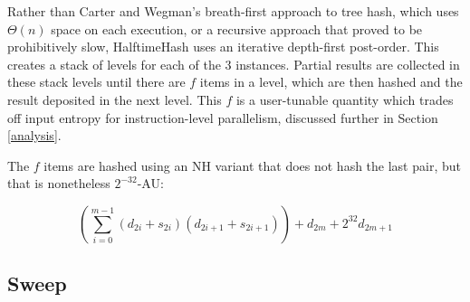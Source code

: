 \documentclass[runningheads]{llncs}
\begin{document}
Rather than Carter and Wegman's breath-first approach to tree hash, which uses $\Theta(n)$ space on each execution, or a recursive approach that proved to be prohibitively slow, HalftimeHash uses an iterative depth-first post-order.
This creates a stack of levels for each of the 3 instances.
Partial results are collected in these stack levels until there are $f$ items in a level, which are then hashed and the result deposited in the next level.
This $f$ is a user-tunable quantity which trades off input entropy for instruction-level parallelism, discussed further in Section \ref{analysis}.

The $f$ items are hashed using an NH variant that does not hash the last pair, but that is nonetheless $2^{-32}$-AU: \cite{badger}

\[
\left(\sum_{i=0}^{m-1} (d_{2i} + s_{2i})(d_{2i+1} + s_{2i+1})\right) + d_{2m} + 2^{32} d_{2m+1}
\]






\subsection{Sweep}
\end{document}
